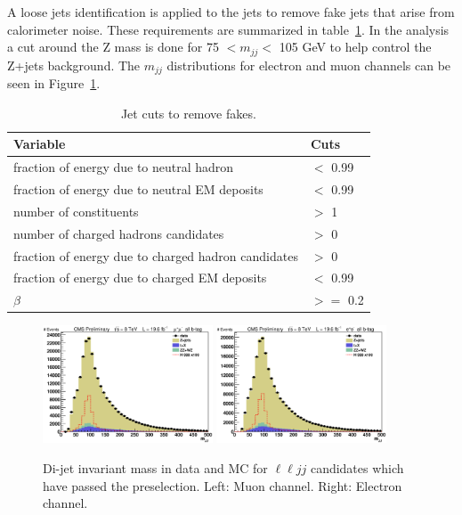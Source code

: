 A loose jets identification is applied to the jets to remove fake jets that arise from calorimeter noise.  These requirements are summarized in table~\ref{tab:jetcuts}.  In the analysis a cut around the Z mass is done for 75 $< m_{jj} <$ 105 GeV to help control the Z+jets background.  The $m_{jj}$ distributions for electron and muon channels can be seen in Figure~\ref{fig:mjj}.
\begin{table}[htb!]
\caption{ 
Jet cuts to remove fakes.
}
\label{tab:jetcuts}
\vspace*{\medskipamount}
\begin{center}
\small
\begin{tabular}{|l|l|}
\hline
Variable & Cuts\\
\hline
fraction of energy due to neutral hadron & $<$ 0.99 \\
fraction of energy due to neutral EM deposits & $<$ 0.99 \\
number of constituents & $>$ 1 \\
number of charged hadrons candidates & $>$ 0 \\
fraction of energy due to charged hadron candidates & $>$ 0 \\
fraction of energy due to charged EM deposits & $<$ 0.99 \\
$\beta$ & $>=$ 0.2  \\
\hline
\end{tabular}
\end{center}
\end{table}

\begin{figure}[htb]
\begin{center}
\centerline{
\includegraphics[width=0.45\textwidth]{presentation/defense/images/preselection/mu/mJJ.eps}
\includegraphics[width=0.45\textwidth]{presentation/defense/images/preselection/el/mJJ.eps}
}
\caption{
Di-jet invariant mass in data and MC for $\ell \ell jj$ candidates which have passed the preselection. Left: Muon channel. Right: Electron channel.
}
\label{fig:mjj}
\end{center}
\end{figure}

